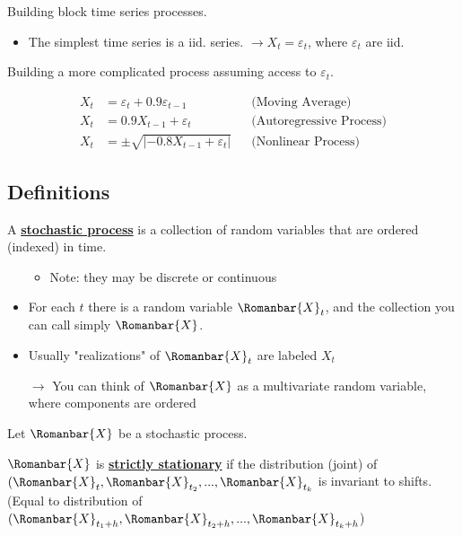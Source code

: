 Building block time series processes.

\begin{itemize}
    \item The simplest time series is a iid. series. $\rightarrow X_t = \varepsilon_t$, where $\varepsilon_t$ are iid.
\end{itemize}

Building a more complicated process assuming access to $\varepsilon_t$.

\begin{align*}
    X_t&= \varepsilon_t + 0.9\varepsilon_{t-1} &&\text{(Moving Average)} \\
    X_t&= 0.9X_{t-1} + \varepsilon_t &&\text{(Autoregressive Process)} \\
    X_t&= \pm \sqrt{|-0.8X_{t-1} + \varepsilon_t|} &&\text{(Nonlinear Process)}
\end{align*}

\subsection{Definitions}

A \textbf{\underline{stochastic process}} is a collection of random variables that are ordered (indexed) in time.

\begin{itemize}
    \item[]
    \begin{itemize}
        \item Note: they may be discrete or continuous
    \end{itemize}
    \item For each $t$ there is a random variable $\Romanbar{X}_t$, and the collection you can call simply $\Romanbar{X}$.
    \item Usually "realizations" of $\Romanbar{X}_t$ are labeled $X_t$
    \item[$\rightarrow$] You can think of $\Romanbar{X}$ as a multivariate random variable, where components are ordered
\end{itemize}

Let $\Romanbar{X}$ be a stochastic process.

\bigskip

$\Romanbar{X}$ is \textbf{\underline{strictly stationary}} if the distribution (joint) of $(\Romanbar{X}_t, \Romanbar{X}_{t_2}, ..., \Romanbar{X}_{t_k} $ is invariant to shifts. (Equal to distribution of $(\Romanbar{X}_{t_1+h}, \Romanbar{X}_{t_2+h}, ..., \Romanbar{X}_{t_k+h} $)

